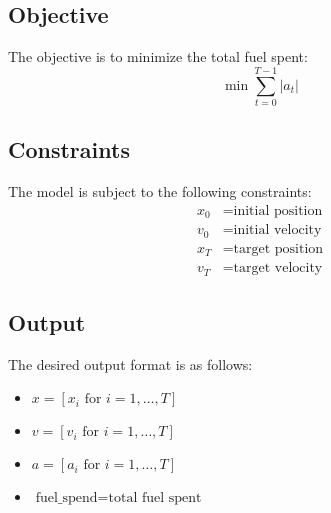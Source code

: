 \documentclass{article}
\begin{document}
\subsection*{Objective}
The objective is to minimize the total fuel spent:
\[
\min \sum_{t=0}^{T-1} |a_t|
\]

\subsection*{Constraints}
The model is subject to the following constraints:
\begin{align*}
    x_0 & = \text{initial position} \\
    v_0 & = \text{initial velocity} \\
    x_T & = \text{target position} \\
    v_T & = \text{target velocity}
\end{align*}

\subsection*{Output}
The desired output format is as follows:
\begin{itemize}
    \item $x = [x_i \text{ for } i = 1, \ldots, T]$
    \item $v = [v_i \text{ for } i = 1, \ldots, T]$
    \item $a = [a_i \text{ for } i = 1, \ldots, T]$
    \item $\text{fuel\_spend} = \text{total fuel spent}$
\end{itemize}
\end{document}
